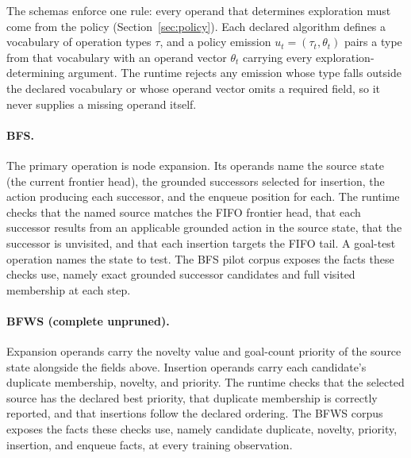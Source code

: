 The schemas enforce one rule: every operand that determines exploration must come from the policy (Section~\ref{sec:policy}). Each declared algorithm defines a vocabulary of operation types $\tau$, and a policy emission $u_t = (\tau_t, \theta_t)$ pairs a type from that vocabulary with an operand vector $\theta_t$ carrying every exploration-determining argument. The runtime rejects any emission whose type falls outside the declared vocabulary or whose operand vector omits a required field, so it never supplies a missing operand itself.

\paragraph{BFS.}
The primary operation is node expansion. Its operands name the source state (the current frontier head), the grounded successors selected for insertion, the action producing each successor, and the enqueue position for each. The runtime checks that the named source matches the FIFO frontier head, that each successor results from an applicable grounded action in the source state, that the successor is unvisited, and that each insertion targets the FIFO tail. A goal-test operation names the state to test. The BFS pilot corpus exposes the facts these checks use, namely exact grounded successor candidates and full visited membership at each step.

\paragraph{BFWS (complete unpruned).}
Expansion operands carry the novelty value and goal-count priority of the source state alongside the fields above. Insertion operands carry each candidate's duplicate membership, novelty, and priority. The runtime checks that the selected source has the declared best priority, that duplicate membership is correctly reported, and that insertions follow the declared ordering. The BFWS corpus exposes the facts these checks use, namely candidate duplicate, novelty, priority, insertion, and enqueue facts, at every training observation.

